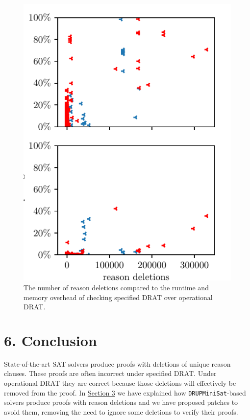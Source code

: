 \documentclass[
]{report}
\begin{document}
\begin{figure}
\centering
\includegraphics{p/correlation-reason-deletions.pdf}
\caption{The number of reason deletions compared to the runtime and
memory overhead of checking specified DRAT over operational
DRAT.\label{fig:correlation-reason-deletions}}
\end{figure}

\hypertarget{conclusion}{%
\chapter{6. Conclusion}\label{conclusion}}

State-of-the-art SAT solvers produce proofs with deletions of unique
reason clauses. These proofs are often incorrect under specified DRAT.
Under operational DRAT they are correct because those deletions will
effectively be removed from the proof. In
\protect\hyperlink{drat-proofs-without-deletions-of-unique-reason-clauses}{Section
3} we have explained how \texttt{DRUPMiniSat}-based solvers produce
proofs with reason deletions and we have proposed patches to avoid them,
removing the need to ignore some deletions to verify their proofs.
\end{document}
